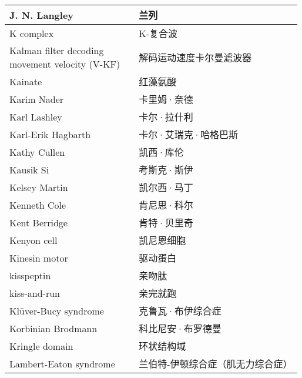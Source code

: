 \begin{longtable}{lll}
	\midrule
	J. N. Langley   && 兰列  \\
	
	\midrule
	K complex   && K-复合波  \\
	
	\midrule
	\makecell[l]{Kalman filter decoding \\movement velocity (V-KF)}   && 解码运动速度卡尔曼滤波器  \\
	
	\midrule
	Kainate   && 红藻氨酸  \\
	
	\midrule
	Karim Nader   && 卡里姆·奈德  \\
	
	\midrule
	Karl Lashley  && 卡尔·拉什利  \\
	
	\midrule
	Karl-Erik Hagbarth  && 卡尔·艾瑞克·哈格巴斯  \\
	
	\midrule
	Kathy Cullen  && 凯西·库伦  \\
	
	\midrule
	Kausik Si  && 考斯克·斯伊  \\
	
	\midrule
	Kelsey Martin   && 凯尔西·马丁  \\
	
	\midrule
	Kenneth Cole   && 肯尼思·科尔  \\
	
	\midrule
	Kent Berridge   && 肯特·贝里奇  \\
	
	\midrule
	Kenyon cell   && 凯尼恩细胞  \\
	
	\midrule
	Kinesin motor   && 驱动蛋白  \\
	
	\midrule
	kisspeptin   && 亲吻肽  \\
	
	\midrule
	kiss-and-run   && 亲完就跑  \\
	
	\midrule
	Klüver-Bucy syndrome   && 克鲁瓦·布伊综合症  \\
	
	\midrule
	Korbinian Brodmann   && 科比尼安·布罗德曼  \\
	
	\midrule
	Kringle domain   && 环状结构域  \\
	
	\midrule
	Lambert-Eaton syndrome   && 兰伯特-伊顿综合症（肌无力综合症）  \\
	

\end{longtable}
